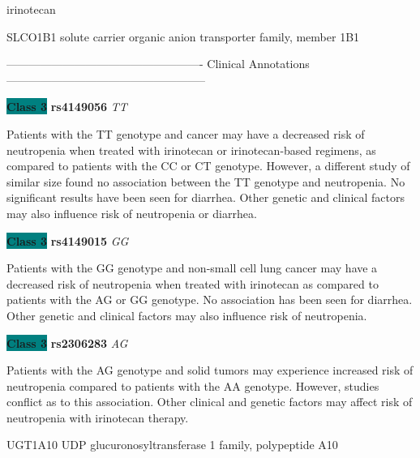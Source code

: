 \documentclass{resume} %
\begin{document}
\begin{rSection}{ irinotecan }
\begin{rSubsection}{ SLCO1B1 }{ solute carrier organic anion transporter family, member 1B1 }{}{}
\item[] ---------------------------------------------------- Clinical Annotations -----------------------------------------------------\newline
\item \textbf{\colorbox{teal} {Class 3}} \textbf{ rs4149056 } \textit{ TT }
\item[] Patients with the TT genotype and cancer may have a decreased risk of neutropenia when treated with irinotecan or irinotecan-based regimens, as compared to patients with the CC or CT genotype. However, a different study of similar size found no association between the TT genotype and neutropenia. No significant results have been seen for diarrhea. Other genetic and clinical factors may also influence risk of neutropenia or diarrhea.\item \textbf{\colorbox{teal} {Class 3}} \textbf{ rs4149015 } \textit{ GG }
\item[] Patients with the GG genotype and non-small cell lung cancer may have a decreased risk of neutropenia when treated with irinotecan as compared to patients with the AG or GG genotype. No association has been seen for diarrhea. Other genetic and clinical factors may also influence risk of neutropenia.\item \textbf{\colorbox{teal} {Class 3}} \textbf{ rs2306283 } \textit{ AG }
\item[] Patients with the AG genotype and solid tumors may experience increased risk of neutropenia compared to patients with the AA genotype. However, studies conflict as to this association. Other clinical and genetic factors may affect risk of neutropenia with irinotecan therapy.
\end{rSubsection}\begin{rSubsection}{ UGT1A10 }{ UDP glucuronosyltransferase 1 family, polypeptide A10 }{}{}
\item[]


\end{rSubsection}
\end{rSection}
\end{document}
